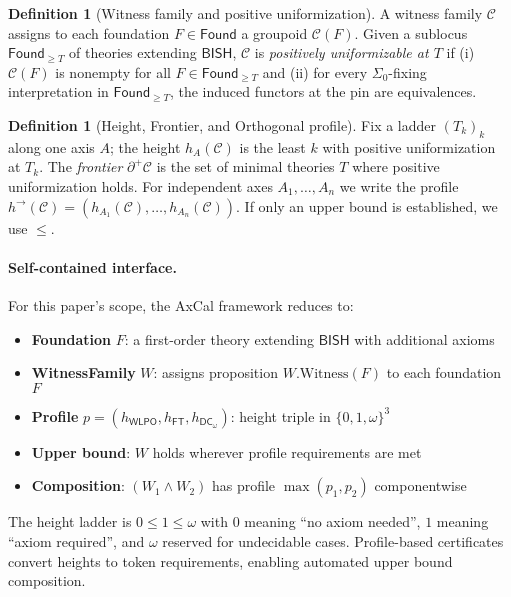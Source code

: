 \documentclass[11pt]{article}
\newcommand{\WLPO}{\mathsf{WLPO}}
\newcommand{\FT}{\mathsf{FT}}
\newcommand{\DCw}{\mathsf{DC}_{\omega}}
\theoremstyle{plain}
\theoremstyle{definition}
\newtheorem{definition}[theorem]{Definition}
\theoremstyle{remark}
\newcommand{\BISH}{\mathsf{BISH}}
\newcommand{\Found}{\mathsf{Found}}
\newcommand{\SigmaZero}{\Sigma_{0}}
\newcommand{\Frontierpos}{\partial^{+}}
\begin{document}
\begin{definition}[Witness family and positive uniformization]
A witness family $\mathcal{C}$ assigns to each foundation $F\in\Found$ a groupoid $\mathcal{C}(F)$.
Given a sublocus $\Found_{\ge T}$ of theories extending $\BISH$, $\mathcal{C}$ is \emph{positively uniformizable at $T$}
if (i) $\mathcal{C}(F)$ is nonempty for all $F\in \Found_{\ge T}$ and (ii) for every $\SigmaZero$-fixing interpretation in $\Found_{\ge T}$,
the induced functors at the pin are equivalences.
\end{definition}

\begin{definition}[Height, Frontier, and Orthogonal profile]
Fix a ladder $(T_k)_k$ along one axis $A$; the height $h_A(\mathcal{C})$ is the least $k$ with positive uniformization at $T_k$.
The \emph{frontier} $\Frontierpos\mathcal{C}$ is the set of minimal theories $T$ where positive uniformization holds.
For independent axes $A_1,\dots,A_n$ we write the profile
$h^{\to}(\mathcal{C})=(h_{A_1}(\mathcal{C}),\ldots,h_{A_n}(\mathcal{C}))$. If only an upper bound is established, we use $\le$.
\end{definition}

\paragraph{Self-contained interface.}
For this paper's scope, the AxCal framework reduces to:
\begin{itemize}
\item \textbf{Foundation} $F$: a first-order theory extending $\BISH$ with additional axioms
\item \textbf{WitnessFamily} $W$: assigns proposition $W.\mathrm{Witness}(F)$ to each foundation $F$
\item \textbf{Profile} $p = (h_{\WLPO}, h_{\FT}, h_{\DCw})$: height triple in $\{0,1,\omega\}^3$
\item \textbf{Upper bound}: $W$ holds wherever profile requirements are met
\item \textbf{Composition}: $(W_1 \land W_2)$ has profile $\max(p_1, p_2)$ componentwise
\end{itemize}
The height ladder is $0 \leq 1 \leq \omega$ with $0$ meaning ``no axiom needed'', $1$ meaning ``axiom required'', and $\omega$ reserved for undecidable cases. Profile-based certificates convert heights to token requirements, enabling automated upper bound composition.
\end{document}
